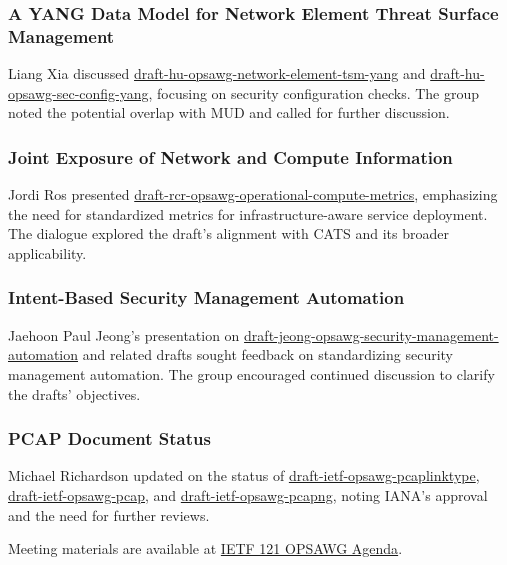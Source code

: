 \documentclass{article}
\begin{document}
\subsubsection{A YANG Data Model for Network Element Threat Surface Management}
Liang Xia discussed \href{https://datatracker.ietf.org/doc/draft-hu-opsawg-network-element-tsm-yang/}{draft-hu-opsawg-network-element-tsm-yang} and \href{https://datatracker.ietf.org/doc/draft-hu-opsawg-sec-config-yang/}{draft-hu-opsawg-sec-config-yang}, focusing on security configuration checks. The group noted the potential overlap with MUD and called for further discussion.

\subsubsection{Joint Exposure of Network and Compute Information}
Jordi Ros presented \href{https://datatracker.ietf.org/doc/draft-rcr-opsawg-operational-compute-metrics/}{draft-rcr-opsawg-operational-compute-metrics}, emphasizing the need for standardized metrics for infrastructure-aware service deployment. The dialogue explored the draft's alignment with CATS and its broader applicability.

\subsubsection{Intent-Based Security Management Automation}
Jaehoon Paul Jeong's presentation on \href{https://datatracker.ietf.org/doc/draft-jeong-opsawg-security-management-automation/}{draft-jeong-opsawg-security-management-automation} and related drafts sought feedback on standardizing security management automation. The group encouraged continued discussion to clarify the drafts' objectives.

\subsubsection{PCAP Document Status}
Michael Richardson updated on the status of \href{https://datatracker.ietf.org/doc/draft-ietf-opsawg-pcaplinktype/}{draft-ietf-opsawg-pcaplinktype}, \href{https://datatracker.ietf.org/doc/draft-ietf-opsawg-pcap/}{draft-ietf-opsawg-pcap}, and \href{https://datatracker.ietf.org/doc/draft-ietf-opsawg-pcapng/}{draft-ietf-opsawg-pcapng}, noting IANA's approval and the need for further reviews.

Meeting materials are available at \href{https://www.ietf.org/proceedings/121/agenda/agenda-121-opsawg-00}{IETF 121 OPSAWG Agenda}.
\end{document}
